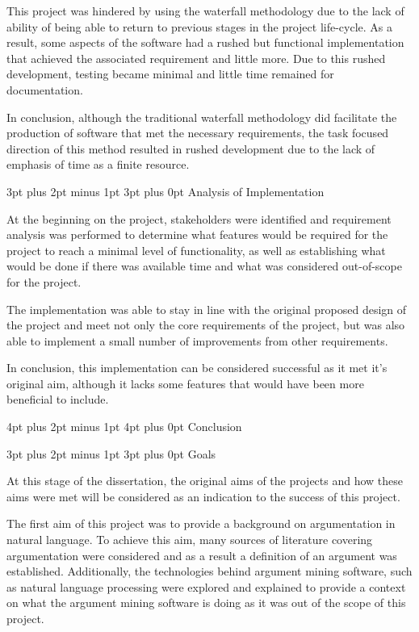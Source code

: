 \documentclass[12pt,a4paper]{article}
\makeatletter
\renewcommand\subsection{\@startsection {subsection}{1}{2mm} %
                               {3pt plus 2pt minus 1pt} %
                               {3pt plus 0pt} %
                               {\normalfont\bfseries}}
\renewcommand\section{\@startsection {section}{1}{0mm} %
                               {4pt plus 2pt minus 1pt} %
                               {4pt plus 0pt} %
                               {\bfseries}}
\makeatother
\begin{document}
This project was hindered by using the waterfall methodology due to the lack of ability of being able to return to previous stages in the project life-cycle. As a result, some aspects of the software had a rushed but functional implementation that achieved the associated requirement and little more. Due to this rushed development, testing became minimal and little time remained for documentation.

In conclusion, although the traditional waterfall methodology did facilitate the production of software that met the necessary requirements, the task focused direction of this method resulted in rushed development due to the lack of emphasis of time as a finite resource. 

\subsection{Analysis of Implementation}

At the beginning on the project, stakeholders were identified and requirement analysis was performed to determine what features would be required for the project to reach a minimal level of functionality, as well as establishing what would be done if there was available time and what was considered out-of-scope for the project.

The implementation was able to stay in line with the original proposed design of the project and meet not only the core requirements of the project, but was also able to implement a small number of improvements from other requirements.

In conclusion, this implementation can be considered successful as it met it's original aim, although it lacks some features that would have been more beneficial to include.

\newpage
\section{Conclusion}

\subsection{Goals}

At this stage of the dissertation, the original aims of the projects and how these aims were met will be considered as an indication to the success of this project.

The first aim of this project was to provide a background on argumentation in natural language. To achieve this aim, many sources of literature covering argumentation were considered and as a result a definition of an argument was established. Additionally, the technologies behind argument mining software, such as natural language processing were explored and explained to provide a context on what the argument mining software is doing as it was out of the scope of this project.
\end{document}
